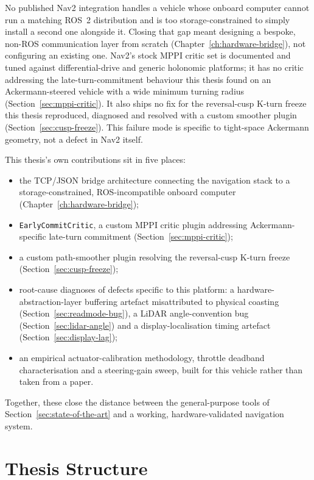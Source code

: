 No published Nav2 integration handles a vehicle whose onboard computer
cannot run a matching ROS~2 distribution and is too
storage-constrained to simply install a second one alongside it.
Closing that gap meant designing a bespoke, non-ROS communication
layer from scratch (Chapter~\ref{ch:hardware-bridge}), not
configuring an existing one. Nav2's stock MPPI critic set is
documented and tuned against differential-drive and generic
holonomic platforms; it has no critic addressing the
late-turn-commitment behaviour this thesis found on an
Ackermann-steered vehicle with a wide minimum turning radius
(Section~\ref{sec:mppi-critic}). It also ships no fix for the
reversal-cusp K-turn freeze this thesis reproduced, diagnosed and
resolved with a custom smoother plugin (Section~\ref{sec:cusp-freeze}).
This failure mode is specific to tight-space Ackermann geometry, not
a defect in Nav2 itself.

This thesis's own contributions sit in five places:

\begin{itemize}
  \item the TCP/JSON bridge architecture connecting the navigation
    stack to a storage-constrained, ROS-incompatible onboard computer
    (Chapter~\ref{ch:hardware-bridge});
  \item \texttt{EarlyCommitCritic}, a custom MPPI critic plugin
    addressing Ackermann-specific late-turn commitment
    (Section~\ref{sec:mppi-critic});
  \item a custom path-smoother plugin resolving the reversal-cusp
    K-turn freeze (Section~\ref{sec:cusp-freeze});
  \item root-cause diagnoses of defects specific to this platform: a
    hardware-abstraction-layer buffering artefact misattributed to
    physical coasting (Section~\ref{sec:readmode-bug}), a LiDAR
    angle-convention bug (Section~\ref{sec:lidar-angle}) and a
    display-localisation timing artefact
    (Section~\ref{sec:display-lag});
  \item an empirical actuator-calibration methodology, throttle
    deadband characterisation and a steering-gain sweep, built for
    this vehicle rather than taken from a paper.
\end{itemize}

Together, these close the distance between the general-purpose tools
of Section~\ref{sec:state-of-the-art} and a working,
hardware-validated navigation system.

\section{Thesis Structure}
\label{sec:thesis-structure}

